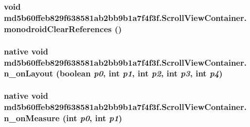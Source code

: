 \hypertarget{classmd5b60ffeb829f638581ab2bb9b1a7f4f3f_1_1_scroll_view_container_140e7fc45e7ee876eabd1c71d9a77e80}{
\subsubsection[{monodroidClearReferences}]{\setlength{\rightskip}{0pt plus 5cm}void md5b60ffeb829f638581ab2bb9b1a7f4f3f.ScrollViewContainer.monodroidClearReferences ()}}
\label{classmd5b60ffeb829f638581ab2bb9b1a7f4f3f_1_1_scroll_view_container_140e7fc45e7ee876eabd1c71d9a77e80}


\hypertarget{classmd5b60ffeb829f638581ab2bb9b1a7f4f3f_1_1_scroll_view_container_281f102bcaec3d0170a3789c0b1c2c85}{
\subsubsection[{n\_\-onLayout}]{\setlength{\rightskip}{0pt plus 5cm}native void md5b60ffeb829f638581ab2bb9b1a7f4f3f.ScrollViewContainer.n\_\-onLayout (boolean {\em p0}, \/  int {\em p1}, \/  int {\em p2}, \/  int {\em p3}, \/  int {\em p4})}}
\label{classmd5b60ffeb829f638581ab2bb9b1a7f4f3f_1_1_scroll_view_container_281f102bcaec3d0170a3789c0b1c2c85}


\hypertarget{classmd5b60ffeb829f638581ab2bb9b1a7f4f3f_1_1_scroll_view_container_597fe37b9a0f078a03f76117dafd7653}{
\subsubsection[{n\_\-onMeasure}]{\setlength{\rightskip}{0pt plus 5cm}native void md5b60ffeb829f638581ab2bb9b1a7f4f3f.ScrollViewContainer.n\_\-onMeasure (int {\em p0}, \/  int {\em p1})}}
\label{classmd5b60ffeb829f638581ab2bb9b1a7f4f3f_1_1_scroll_view_container_597fe37b9a0f078a03f76117dafd7653}


